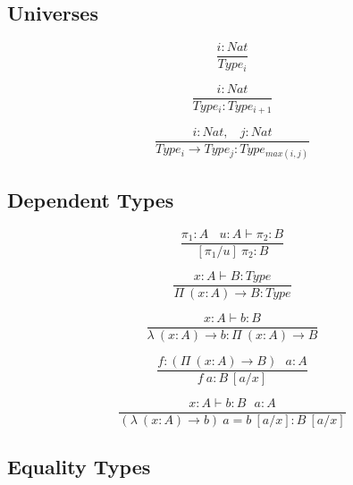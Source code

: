 \documentclass[11pt,oneside]{article}
\begin{document}
  \subsection{Universes}

\begin{equation}
\tag{sorts}
\dfrac
  {i : Nat}
  {Type_i}
\end{equation}

\begin{equation}
\tag{axioms}
\dfrac
  {i: Nat}
  {Type_i : Type_{i+1}}
\end{equation}

\begin{equation}
\tag{rules}
\dfrac
  {i : Nat,\ \ \ \ j : Nat}
  {Type_i \rightarrow Type_{j} : Type_{max(i,j)}}
\end{equation}

  \subsection{Dependent Types}

\begin{equation}
\tag{subst}
\dfrac
  {\pi_1 : A\ \ \ \ u:A \vdash \pi_2 : B}
  {[\pi_1/u]\ \pi_2 : B}
\end{equation}

\begin{equation}
\tag{$\Pi$-formation}
\dfrac
  {x:A \vdash B : Type}
  {\Pi\ (x:A) \rightarrow B : Type}
\end{equation}

\begin{equation}
\tag{$\lambda$-intro}
\dfrac
  {x:A \vdash b : B}
  {\lambda\ (x:A) \rightarrow b : \Pi\ (x: A) \rightarrow B }
\end{equation}

\begin{equation}
\tag{$App$-elimination}
\dfrac
  {f: (\Pi\ (x:A) \rightarrow B)\ \ \ a: A}
  {f\ a : B\ [a/x]}
\end{equation}

\begin{equation}
\tag{$\beta$-computation}
\dfrac
  {x:A \vdash b: B\ \ \ a:A}
  {(\lambda\ (x:A) \rightarrow b)\ a = b\ [a/x] : B\ [a/x]}
\end{equation}

  \subsection{Equality Types}
\end{document}
